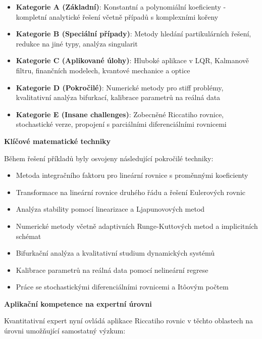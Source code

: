 \begin{itemize}
\item \textbf{Kategorie A (Základní)}: Konstantní a polynomiální koeficienty - kompletní analytické řešení včetně případů s komplexními kořeny
\item \textbf{Kategorie B (Speciální případy)}: Metody hledání partikulárních řešení, redukce na jiné typy, analýza singularit
\item \textbf{Kategorie C (Aplikované úlohy)}: Hluboké aplikace v LQR, Kalmanově filtru, finančních modelech, kvantové mechanice a optice
\item \textbf{Kategorie D (Pokročilé)}: Numerické metody pro stiff problémy, kvalitativní analýza bifurkací, kalibrace parametrů na reálná data
\item \textbf{Kategorie E (Insane challenges)}: Zobecněné Riccatiho rovnice, stochastické verze, propojení s parciálními diferenciálními rovnicemi
\end{itemize}

\vspace{1\baselineskip}

\noindent\textbf{Klíčové matematické techniky}

Během řešení příkladů byly osvojeny následující pokročilé techniky:
\begin{itemize}
\item Metoda integračního faktoru pro lineární rovnice s proměnnými koeficienty
\item Transformace na lineární rovnice druhého řádu a řešení Eulerových rovnic
\item Analýza stability pomocí linearizace a Ljapunovových metod
\item Numerické metody včetně adaptivních Runge-Kuttových metod a implicitních schémat
\item Bifurkační analýza a kvalitativní studium dynamických systémů
\item Kalibrace parametrů na reálná data pomocí nelineární regrese
\item Práce se stochastickými diferenciálními rovnicemi a Itôovým počtem
\end{itemize}

\vspace{1\baselineskip}

\noindent\textbf{Aplikační kompetence na expertní úrovni}

Kvantitativní expert nyní ovládá aplikace Riccatiho rovnic v těchto oblastech na úrovni umožňující samostatný výzkum:

